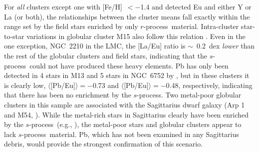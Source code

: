 \documentclass{emulateapj}
\def\rpro{\mbox{$r$-process}}
\def\spro{\mbox{$s$-process}}
\begin{document}
For \textit{all} clusters except one with [Fe/H]~$< -$1.4 and detected
Eu and either Y or La (or both), the relationships
between the cluster means fall exactly within the range set by
the field stars enriched by only \rpro\ material.
Intra-cluster star-to-star variations in globular cluster M15
also follow this relation \citep{otsuki06}.
Even in the one exception, NGC~2210 in the LMC, the [La/Eu]
ratio is $\sim$~0.2~dex \textit{lower} than the rest of the globular clusters
and field stars, indicating that the \spro\ could not have produced
these heavy elements.
Pb has only been detected in 4 stars in M13 and
5 stars in NGC~6752 by \citet{yong06}, 
but in these clusters it is clearly low,
$\langle$[Pb/Eu]$\rangle = -$0.73 and
$\langle$[Pb/Eu]$\rangle = -$0.48, respectively,
indicating that there has been no enrichment by the \spro.
Two metal-poor globular clusters in this sample 
are associated with the Sagittarius dwarf galaxy 
(Arp 1 and M54, \citealt{ibata95,law10}).
While the metal-rich stars in Sagittarius clearly have been 
enriched by the \spro\ (e.g., \citealt{chou10}), the metal-poor
stars and globular clusters appear to lack \spro\ material.
Pb, which has not been examined in any Sagittarius debris, 
would provide the strongest confirmation of this scenario.
\end{document}
